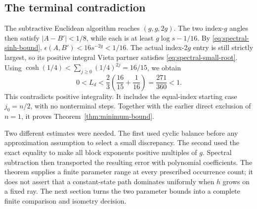 \subsection{The terminal contradiction}

The subtractive Euclidean algorithm reaches $(g,g,2g)$.
The two index-$g$ angles then satisfy $|A-B'|<1/8$, while each is
at least $g\log s-1/16$. By \eqref{eq:spectral-sinh-bound},
$\epsilon(A,B')<16s^{-2g}<1/16$.
The actual index-$2g$ entry is still strictly largest, so its positive
integral Vieta partner satisfies \eqref{eq:spectral-small-root}.
Using $\cosh(1/4)<\sum_{j\geqslant0}(1/4)^{2j}=16/15$, we obtain
$$
 0<L_d<\frac23\left(\frac{16}{15}+\frac1{16}\right)
       =\frac{271}{360}<1.
$$
This contradicts positive integrality. It includes the equal-index
starting case $j_0=n/2$, with no nonterminal steps. Together with the
earlier direct exclusion of $n=1$, it proves
Theorem~\ref{thm:minimum-bound}.

Two different estimates were needed. The first used cyclic balance
before any approximation assumption to select a small discrepancy.
The second used the exact equality to make all block exponents
positive multiples of $g$. Spectral subtraction then transported the
resulting error with polynomial coefficients. The theorem supplies a
finite parameter range at every prescribed occurrence count; it does
not assert that a constant-state path dominates uniformly when $h$
grows on a fixed ray. The next section turns the two parameter bounds
into a complete finite comparison and isometry decision.
